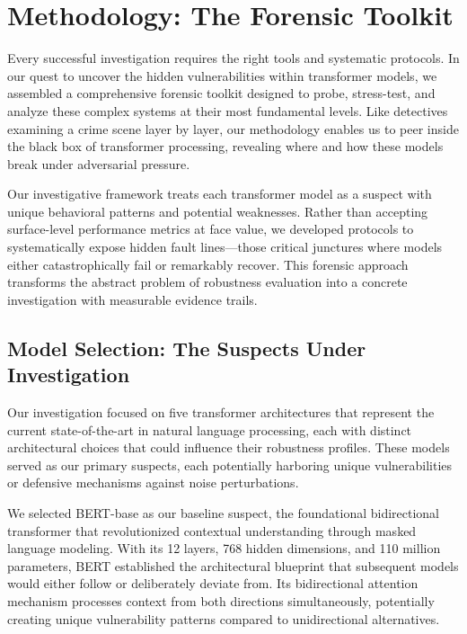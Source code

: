 \section{Methodology: The Forensic Toolkit}

Every successful investigation requires the right tools and systematic protocols. In our quest to uncover the hidden vulnerabilities within transformer models, we assembled a comprehensive forensic toolkit designed to probe, stress-test, and analyze these complex systems at their most fundamental levels. Like detectives examining a crime scene layer by layer, our methodology enables us to peer inside the black box of transformer processing, revealing where and how these models break under adversarial pressure.

Our investigative framework treats each transformer model as a suspect with unique behavioral patterns and potential weaknesses. Rather than accepting surface-level performance metrics at face value, we developed protocols to systematically expose hidden fault lines—those critical junctures where models either catastrophically fail or remarkably recover. This forensic approach transforms the abstract problem of robustness evaluation into a concrete investigation with measurable evidence trails.

\subsection{Model Selection: The Suspects Under Investigation}

Our investigation focused on five transformer architectures that represent the current state-of-the-art in natural language processing, each with distinct architectural choices that could influence their robustness profiles. These models served as our primary suspects, each potentially harboring unique vulnerabilities or defensive mechanisms against noise perturbations.

We selected BERT-base \cite{devlin2019bert} as our baseline suspect, the foundational bidirectional transformer that revolutionized contextual understanding through masked language modeling. With its 12 layers, 768 hidden dimensions, and 110 million parameters, BERT established the architectural blueprint that subsequent models would either follow or deliberately deviate from. Its bidirectional attention mechanism processes context from both directions simultaneously, potentially creating unique vulnerability patterns compared to unidirectional alternatives.

